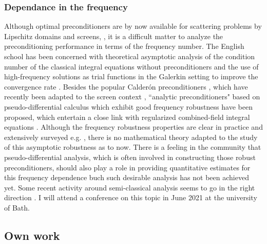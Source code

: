 \documentclass[]{article}
\begin{document}
\subsubsection*{Dependance in the frequency}

Although optimal preconditioners are by now available for scattering problems by Lipschitz domains and screens, \cite{steinbach1998construction,hiptmair2006operator}, it is a difficult matter to analyze the preconditioning performance in terms of the frequency number. The English school has been concerned with theoretical asymptotic analysis of the condition number of the classical integral equations without preconditioners \cite{chandler2020high} and the use of high-frequency solutions as trial functions in the Galerkin setting to improve the convergence rate \cite{chandlerWilde2015high}. Besides the popular Calder\'{o}n preconditioners \cite{christiansen2000preconditionneurs,christiansen2002preconditioner}, which have recently been adapted to the screen context \cite{bruno2012second},  ``analytic preconditioners" based on pseudo-differential calculus which exhibit good frequency robustness \cite{antoine2007generalized} have been proposed, which entertain a close link with regularized combined-field integral equations \cite{buffa2005regularized}. Although the frequency robustness properties are clear in practice and extensively surveyed e.g. \cite{boubendir2014well}, there is no mathematical theory adapted to the study of this asymptotic robustness as to now. There is a feeling in the community that pseudo-differential analysis, which is often involved in constructing those robust preconditioners, should also play a role in providing quantitative estimates for this frequency dependence buch such desirable analysis has not been achieved yet. Some recent activity around semi-classical analysis seems to go in the right direction \cite{galkowski2019wavenumber}. I will attend a conference on this topic in June 2021 at the university of Bath. 


\subsection*{Own work}
\end{document}
